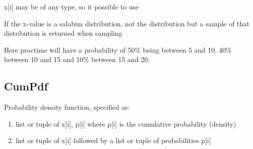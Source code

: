 \documentclass[letterpaper,10pt,english]{sphinxmanual}
\begin{document}
x{[}i{]} may be of any type, so it possible to use

%
\begin{sphinxVerbatim}[commandchars=\\\{\}]
       
  
\end{sphinxVerbatim}

If the x-value is a salabim distribution, not the distribution but a sample of that distribution is returned when sampling

%
\begin{sphinxVerbatim}[commandchars=\\\{\}]
          
\end{sphinxVerbatim}

Here proctime will have a probability of 50\% being between 5 and 10, 40\% between 10 and 15 and 10\% between 15 and 20.


\subsection{CumPdf}
\label{\detokenize{Distributions:cumpdf}}
Probability density function, specified as:
\begin{enumerate}
\item {} 
list or tuple of x{[}i{]}, p{[}i{]} where p{[}i{]} is the cumulative probability (density)

\item {} 
list or tuple of x{[}i{]} followed by a list or tuple of probabilities p{[}i{]}

\end{enumerate}
\end{document}
